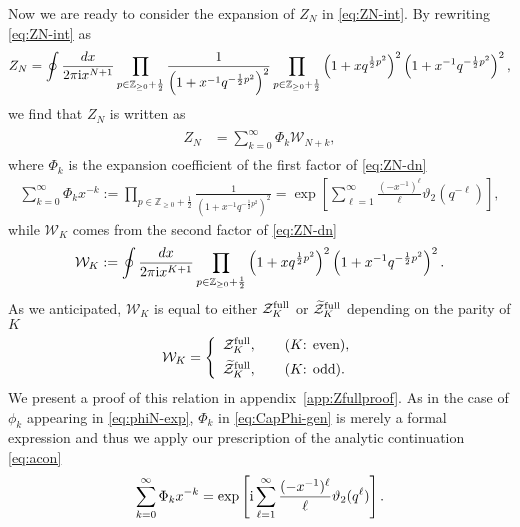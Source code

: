 \documentclass[11pt]{article}
\newcommand{\ri}{{\rm i}}
\newcommand{\hf}{\frac{1}{2}}
\renewcommand{\[}{\begin{eqnarray}}
\renewcommand{\]}{\end{eqnarray}}
\newcommand{\Zefull}{{\cal Z}^{\text{full}}}
\newcommand{\Zofull}{{\widetilde{\cal Z}}^{\text{full}}}
\begin{document}
Now we are ready to consider the expansion of $Z_N$
in \eqref{eq:ZN-int}.
By rewriting \eqref{eq:ZN-int}
as
\begin{equation}
\begin{aligned}
 Z_N=\oint\frac{dx}{2\pi\ri x^{N+1}}
\prod_{p\in\mathbb{Z}_{\geq0}+\hf}\frac{1}{\left(1+x^{-1}q^{-\hf p^2}\right)^2}
\prod_{p\in\mathbb{Z}_{\geq0}+\hf}
\left(1+xq^{\hf p^2}\right)^2\left(1+x^{-1}q^{-\hf p^2}\right)^2,
\end{aligned} 
\label{eq:ZN-dn}
\end{equation}
we find that $Z_N$ is written as
\begin{align}
\begin{aligned}
 Z_N
&=\sum_{k=0}^\infty \Phi_k\mathcal{W}_{N+k},
\label{eq:ZN-exp}
\end{aligned}
\end{align}
where  $\Phi_k$ 
is the expansion coefficient of the first factor of
\eqref{eq:ZN-dn}
%
\begin{align}
\sum_{k=0}^\infty \Phi_kx^{-k}
:= \prod_{p\in\mathbb{Z}_{\geq0}+\hf}\frac{1}{\left(1+x^{-1}q^{-\hf p^2}\right)^2}
=\exp\left[\sum_{\ell=1}^\infty \frac{(-x^{-1})^\ell}{\ell}
\vartheta_2(q^{-\ell})\right],
\label{eq:CapPhi-gen}
\end{align}
%
while $\mathcal{W}_K$ comes from
the second factor of
\eqref{eq:ZN-dn}
%
\begin{align}
\mathcal{W}_K:=
\oint\frac{dx}{2\pi\ri x^{K+1}}
 \prod_{p\in\mathbb{Z}_{\geq0}+\hf}\left(1+x q^{\hf p^2}\right)^2
            \left(1+x^{-1} q^{-\hf p^2}\right)^2.
\end{align}
As we anticipated, $\mathcal{W}_K$
is equal to either $\Zefull_K$ or $\Zofull_K$
depending on the parity of $K$
\begin{align}
\mathcal{W}_K
 =\left\{\begin{array}{l}
 \Zefull_K, \qquad \mbox{($K$: even)}, \\[1ex]
 \Zofull_K, \qquad \mbox{($K$: odd)}.
         \end{array}\right.
\label{eq:WK-cond}
\end{align}%
We present a proof of this relation in appendix~\ref{app:Zfullproof}.
As in the case of $\phi_k$ appearing in 
\eqref{eq:phiN-exp}, 
$\Phi_k$ in \eqref{eq:CapPhi-gen} is merely a formal expression
and thus we apply our prescription of the analytic continuation \eqref{eq:acon}
%
\begin{align}
\sum_{k=0}^\infty \Phi_kx^{-k}
=\exp\left[\ri \sum_{\ell=1}^\infty \frac{(-x^{-1})^\ell}{\ell}
\vartheta_2(q^\ell)\right].
\end{align}
\end{document}
